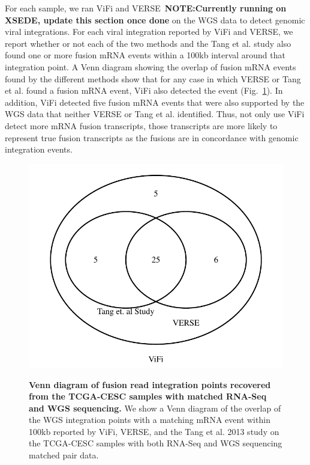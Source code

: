 \documentclass[10pt]{article}
\begin{document}
For each sample, we ran ViFi and VERSE~\textbf{NOTE:Currently running on XSEDE, update this section once done} on the WGS data to detect genomic viral integrations.  For each viral integration reported by ViFi and VERSE, we report whether or not each of the two methods and the Tang et al. study also found one or more fusion mRNA events within a 100kb interval around that integration point.  A Venn diagram showing the overlap of fusion mRNA events found by the different methods show that for any case in which VERSE or Tang et al. found a fusion mRNA event, ViFi also detected the event (Fig.~\ref{venn_diagram}).  In addition, ViFi detected five fusion mRNA events that were also supported by the WGS data that neither VERSE or Tang et al. identified.  Thus, not only use ViFi detect more mRNA fusion transcripts, those transcripts are more likely to represent true fusion transcripts as the fusions are in concordance with genomic integration events. %

\begin{figure}[htpb]
  \centering
  \includegraphics[width=1\linewidth]{results/tcga_triple.pdf}\\
\caption[Venn diagram of fusion reads recovered from the RNAseq data from Larsson 2013 study]
{\label{venn_diagram}  {\bf Venn diagram of fusion read integration points recovered from the TCGA-CESC samples with matched RNA-Seq and WGS sequencing.}  We show a Venn diagram of the overlap of the WGS integration points with a matching mRNA event within 100kb reported by ViFi, VERSE, and the Tang et al. 2013 study on the TCGA-CESC samples with both RNA-Seq and WGS sequencing matched pair data.  }
\end{figure}
\end{document}
